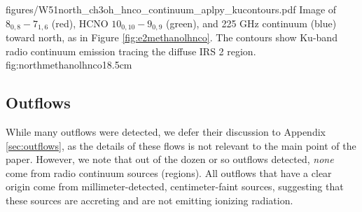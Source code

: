 \documentclass{aa}
\begin{document}
\Figure
{figures/W51north_ch3oh_hnco_continuum_aplpy_kucontours.pdf}
{Image of \methanol $8_{0,8}-7_{1,6}$ (red), HCNO $10_{0,10}-9_{0,9}$ (green),
and 225 GHz continuum (blue) toward  north, as in Figure
\ref{fig:e2methanolhnco}.  The contours show Ku-band radio continuum emission
tracing the diffuse IRS 2 \hii region.}
{fig:northmethanolhnco}{1}{8.5cm}

\subsection{Outflows}
\label{sec:mainoutflows}
While many outflows were detected, we defer their discussion to Appendix
\ref{sec:outflows}, as the details of these flows is not relevant to the main
point of the paper.  However, we note that out of the dozen or so outflows
detected, \emph{none} come from radio continuum sources (\hii regions).  All
outflows that have a clear origin come from millimeter-detected,
centimeter-faint sources, suggesting that these sources are accreting and are
not emitting ionizing radiation.








\end{document}
